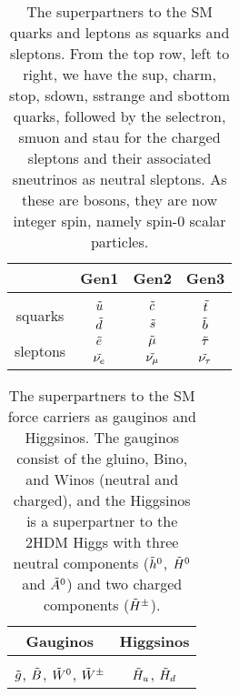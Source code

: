 \begin{table}[htbp]
    \centering
    \begin{tabular}{||c|c|c|c||}
    \hline
    & Gen1 & Gen2 & Gen3 \\
    \hline
    & \\[-2.7ex]
    \multirow{2}{1.4cm}{squarks} & $\Tilde{u}$ & $\Tilde{c}$ & \small$\Tilde{t}$ \\
     & $\Tilde{d}$ & $\Tilde{s}$ & $\Tilde{b}$ \\
    \hline
    
    \multirow{2}{1.4cm}{sleptons} & $\Tilde{e}$ & $\Tilde{\mu}$ & $\Tilde{\tau}$ \\
     & $\Tilde{\nu_e}$ & $\Tilde{\nu_\mu}$ & $\Tilde{\nu_\tau}$ \\
    \hline
    \end{tabular}
    \caption{The superpartners to the SM quarks and leptons as squarks and sleptons. From the top row, left to right, we have the sup, charm, stop, sdown, sstrange and sbottom quarks, followed by the selectron, smuon and stau for the charged sleptons and their associated sneutrinos as neutral sleptons. As these are bosons, they are now integer spin, namely spin-0 scalar particles.}
    \label{tab:SUSYspart}
\end{table}

\begin{table}[htbp]
    \centering
    \begin{tabular}{||c|c||}
    \hline 
       Gauginos  & Higgsinos \\
       \hline
        & \\[-2.5ex]
      $\Tilde{g}$, $\Tilde{B}$, $\Tilde{W}^0$, $\Tilde{W}^\pm$ & $\Tilde{H}_u$,  $\Tilde{H}_d$ \\
     \hline
    \end{tabular}
    \caption{The superpartners to the SM force carriers as gauginos and Higgsinos. The gauginos consist of the gluino, Bino, and Winos (neutral and charged), and the Higgsinos is a superpartner to the 2HDM Higgs with three neutral components ($\Tilde{h}^0$, $\Tilde{H}^0$ and $\Tilde{A}^0$) and two charged components ($\Tilde{H}^\pm$).}
    \label{tab:SUSYinos}
\end{table}

